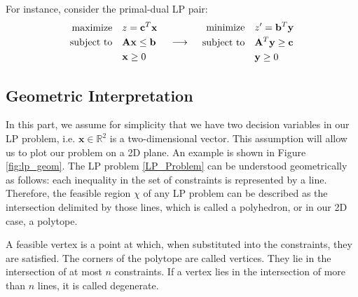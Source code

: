 For instance, consider the primal-dual LP pair:
\[
    \begin{array}{c@{\quad}c@{\quad}c}
        \begin{aligned}
            \text{maximize} \quad   & z = \mathbf{c}^T \mathbf{x}           \\
            \text{subject to} \quad & \mathbf{A} \mathbf{x} \leq \mathbf{b} \\
                                    & \mathbf{x} \geq 0                     \\
        \end{aligned}
         &
        \begin{array}{c}
            \longrightarrow
        \end{array}
         &
        \begin{aligned}
            \text{minimize} \quad   & z' = \mathbf{b}^T \mathbf{y}            \\
            \text{subject to} \quad & \mathbf{A}^T \mathbf{y} \geq \mathbf{c} \\
                                    & \mathbf{y} \geq 0                       \\
        \end{aligned}
    \end{array}
\]

\subsection{Geometric Interpretation}
In this part, we assume for simplicity that we have two decision variables in our LP problem, i.e. $\mathbf{x} \in \mathbb{R}^2 $ is a two-dimensional vector. This assumption will allow us to plot our problem on a 2D plane. An example is shown in Figure \ref{fig:lp_geom}. The LP problem \ref{LP_Problem} can be understood geometrically as follows: each inequality in the set of constraints is represented by a line. Therefore, the feasible region $\chi$ of any LP problem can be described as the intersection delimited by those lines, which is called a polyhedron, or in our 2D case, a polytope.

A feasible vertex is a point at which, when substituted into the constraints, they are satisfied.
The corners of the polytope are called vertices.
They lie in the intersection of at most $n$ constraints. If a vertex lies in the intersection of more than $n$ lines, it is called degenerate.

